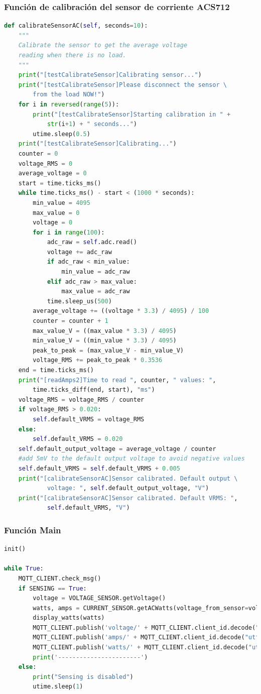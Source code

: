 \begin{titlepage}
\subsubsection{Función de calibración del sensor de corriente ACS712}
\begin{lstlisting}[language=python]
def calibrateSensorAC(self, seconds=10):
	"""
	Calibrate the sensor to get the average voltage 
	reading when there is no load.
	"""
	print("[testCalibrateSensor]Calibrating sensor...")
	print("[testCalibrateSensor]Please disconnect the sensor \
		from the load NOW!")
	for i in reversed(range(5)):
		print("[testCalibrateSensor]Starting calibration in " + 
			str(i+1) + " seconds...")
		utime.sleep(0.5)
	print("[testCalibrateSensor]Calibrating...")
	counter = 0
	voltage_RMS = 0
	average_voltage = 0
	start = time.ticks_ms()
	while time.ticks_ms() - start < (1000 * seconds):
		min_value = 4095
		max_value = 0
		voltage = 0
		for i in range(100):
			adc_raw = self.adc.read()
			voltage += adc_raw
			if adc_raw < min_value:
				min_value = adc_raw
			elif adc_raw > max_value:
				max_value = adc_raw
			time.sleep_us(500)
		average_voltage += ((voltage * 3.3) / 4095) / 100
		counter = counter + 1
		max_value_V = ((max_value * 3.3) / 4095)
		min_value_V = ((min_value * 3.3) / 4095)
		peak_to_peak = (max_value_V - min_value_V)
		voltage_RMS += peak_to_peak * 0.3536
	end = time.ticks_ms()
	print("[readAmps2]Time to read ", counter, " values: ", 
		time.ticks_diff(end, start), "ms")
	voltage_RMS = voltage_RMS / counter
	if voltage_RMS > 0.020:
		self.default_VRMS = voltage_RMS
	else:
		self.default_VRMS = 0.020
	self.default_output_voltage = average_voltage / counter
	#add 5mV to the default output voltage to avoid negative values
	self.default_VRMS = self.default_VRMS + 0.005
	print("[calibrateSensorAC]Sensor calibrated. Default output \
			voltage: ", self.default_output_voltage, "V")
	print("[calibrateSensorAC]Sensor calibrated. Default VRMS: ", 
			self.default_VRMS, "V")
\end{lstlisting}

\subsubsection{Función Main}
\begin{lstlisting}[language=python]
init()

while True:
	MQTT_CLIENT.check_msg()
	if SENSING == True:
		voltage = VOLTAGE_SENSOR.getVoltage()
		watts, amps = CURRENT_SENSOR.getACWatts(voltage_from_sensor=voltage, logging=False)
		display_watts(watts)
		MQTT_CLIENT.publish('voltage/' + MQTT_CLIENT.client_id.decode("utf-8"), str(voltage))
		MQTT_CLIENT.publish('amps/' + MQTT_CLIENT.client_id.decode("utf-8"), str(amps))
		MQTT_CLIENT.publish('watts/' + MQTT_CLIENT.client_id.decode("utf-8"), str(watts))
		print('-----------------------')
	else:
		print("Sensing is disabled")
		utime.sleep(1)
\end{lstlisting}


\end{titlepage}
